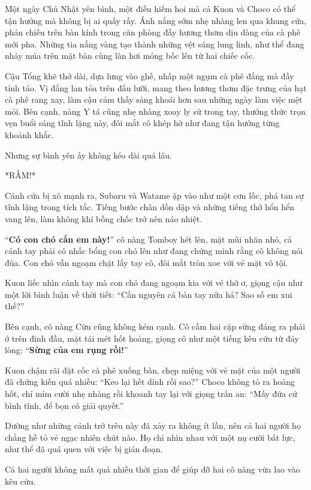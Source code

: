 \documentclass[../main.tex]{subfiles}
\begin{document}
Một ngày Chủ Nhật yên bình, một điều hiếm hoi mà cả Kuon và Choco có thể tận hưởng mà không bị ai quấy rầy. Ánh nắng sớm nhẹ nhàng len qua khung cửa, phản chiếu trên bàn kính trong căn phòng đầy hương thơm dịu dàng của cà phê mới pha. Những tia nắng vàng tạo thành những vệt sáng lung linh, như thể đang nhảy múa trên mặt bàn cùng làn hơi mỏng bốc lên từ hai chiếc cốc.

Cậu Tổng khẽ thở dài, dựa lưng vào ghế, nhấp một ngụm cà phê đắng mà đầy tỉnh táo. Vị đắng lan tỏa trên đầu lưỡi, mang theo hương thơm đặc trưng của hạt cà phê rang xay, làm cậu cảm thấy sảng khoái hơn sau những ngày làm việc mệt mỏi. Bên cạnh, nàng Y tá cũng nhẹ nhàng xoay ly sứ trong tay, thưởng thức trọn vẹn buổi sáng tĩnh lặng này, đôi mắt cô khép hờ như đang tận hưởng từng khoảnh khắc.

Nhưng sự bình yên ấy không kéo dài quá lâu.

*RẦM!*

Cánh cửa bị xô mạnh ra, Subaru và Watame ập vào như một cơn lốc, phá tan sự tĩnh lặng trong tích tắc. Tiếng bước chân dồn dập và những tiếng thở hổn hển vang lên, làm không khí bỗng chốc trở nên náo nhiệt.


``\textbf{Có con chó cắn em này!}'' cô nàng Tomboy hét lên, mặt mũi nhăn nhó, cả cánh tay phải cô nhấc bổng con chó lên như đang chứng minh rằng cô không nói đùa. Con chó vẫn ngoạm chặt lấy tay cô, đôi mắt tròn xoe với vẻ mặt vô tội.

Kuon liếc nhìn cánh tay mà con chó đang ngoạm kia với vẻ thờ ơ, giọng cậu như một lời bình luận về thời tiết: ``Cắn nguyên cả bàn tay nữa hả? Sao số em xui thế?''

Bên cạnh, cô nàng Cừu cũng không kém cạnh. Cô cầm hai cặp sừng đáng ra phải ở trên đỉnh đầu, mặt tái mét hốt hoảng, giọng cô như một tiếng kêu cứu từ đáy lòng: ``\textbf{Sừng của em rụng rồi!}''

Kuon chậm rãi đặt cốc cà phê xuống bàn, chẹp miệng với vẻ mặt của một người đã chứng kiến quá nhiều: ``Keo lại hết dính rồi sao?'' Choco không tỏ ra hoảng hốt, chỉ mỉm cười nhẹ nhàng rồi khoanh tay lại với giọng trấn an: ``Mấy đứa cứ bình tĩnh, để bọn cô giải quyết.''

Dường như những cảnh trớ trêu này đã xảy ra không ít lần, nên cả hai người họ chẳng hề tỏ vẻ ngạc nhiên chút nào. Họ chỉ nhìn nhau với một nụ cười bất lực, như thể đã quá quen với việc bị gián đoạn.

\ct

Cả hai người không mất quá nhiều thời gian để giúp đỡ hai cô nàng vừa lao vào kêu cứu.
\end{document}
